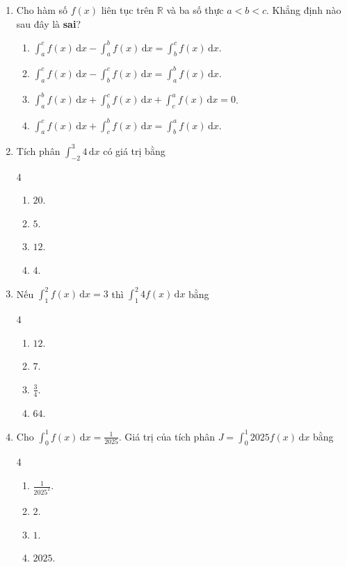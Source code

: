 \documentclass[12pt]{article}
\begin{document}
\begin{enumerate}[label=\textbf{Câu \arabic*.}]
		\item Cho hàm số $f(x)$ liên tục trên $\mathbb{R}$ và ba số thực $a < b < c$. Khẳng định nào sau đây là \textbf{sai}?
		\begin{enumerate}[label=\textbf{\Alph*.}]
				\item $\displaystyle \int_a^c f(x)\,\mathrm{d}x - \int_a^b f(x)\,\mathrm{d}x = \int_b^c f(x)\,\mathrm{d}x$.
				\item $\displaystyle \int_a^c f(x)\,\mathrm{d}x - \int_b^c f(x)\,\mathrm{d}x = \int_a^b f(x)\,\mathrm{d}x$.
				\item $\displaystyle \int_a^b f(x)\,\mathrm{d}x + \int_b^c f(x)\,\mathrm{d}x + \int_c^a f(x)\,\mathrm{d}x = 0$.
				\item $\displaystyle \int_a^c f(x)\,\mathrm{d}x + \int_c^b f(x)\,\mathrm{d}x = \int_b^a f(x)\,\mathrm{d}x$.
			\end{enumerate}
		
		\item Tích phân $\displaystyle \int_{-2}^{3} 4\,\mathrm{d}x$ có giá trị bằng
		\begin{multicols}{4}
			\begin{enumerate}[label=\textbf{\Alph*.}]
				\item $20$.
				\item $5$.
				\item $12$.
				\item $4$.
			\end{enumerate}
		\end{multicols}
		
		\item Nếu $\displaystyle \int_1^2 f(x)\,\mathrm{d}x = 3$ thì $\displaystyle \int_1^2 4f(x)\,\mathrm{d}x$ bằng
		\begin{multicols}{4}
			\begin{enumerate}[label=\textbf{\Alph*.}]
				\item $12$.
				\item $7$.
				\item $\frac{3}{4}$.
				\item $64$.
			\end{enumerate}
		\end{multicols}
		
		\item Cho $\displaystyle \int_0^1 f(x)\,\mathrm{d}x = \frac{1}{2025}$. Giá trị của tích phân $J = \displaystyle \int_0^1 2025f(x)\,\mathrm{d}x$ bằng
		\begin{multicols}{4}
			\begin{enumerate}[label=\textbf{\Alph*.}]
				\item $\frac{1}{2025^2}$.
				\item $2$.
				\item $1$.
				\item $2025$.
			\end{enumerate}
		\end{multicols}
		

\end{enumerate}
\end{document}

